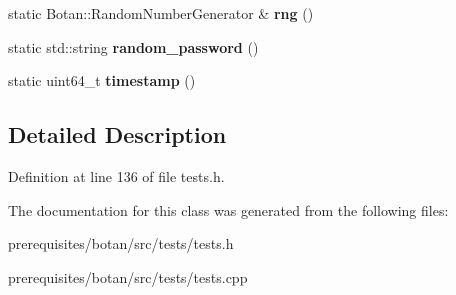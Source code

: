 \begin{DoxyCompactItemize}
\item 
\mbox{\label{class_botan___tests_1_1_test_a933d78646752dc29a03a1c140f3c3bd3}} 
static Botan\+::\+Random\+Number\+Generator \& {\bfseries rng} ()
\item 
\mbox{\label{class_botan___tests_1_1_test_ab4366a760462b302fd4c759468ef0851}} 
static std\+::string {\bfseries random\+\_\+password} ()
\item 
\mbox{\label{class_botan___tests_1_1_test_a0198239263cbec906f2440cc71bd62f8}} 
static uint64\+\_\+t {\bfseries timestamp} ()
\end{DoxyCompactItemize}


\subsection{Detailed Description}


Definition at line 136 of file tests.\+h.



The documentation for this class was generated from the following files\+:\begin{DoxyCompactItemize}
\item 
prerequisites/botan/src/tests/tests.\+h\item 
prerequisites/botan/src/tests/tests.\+cpp\end{DoxyCompactItemize}
